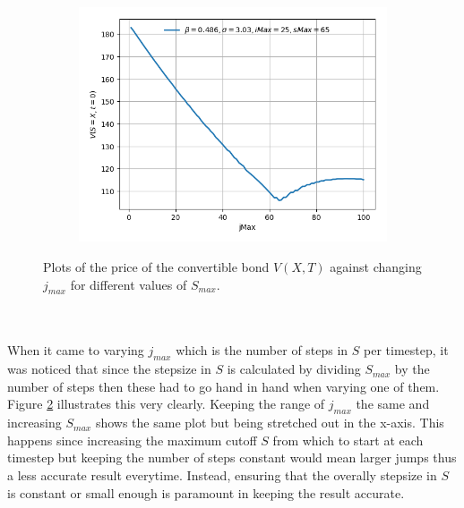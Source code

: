\documentclass{article}
\begin{document}
\medskip
\begin{figure}[!ht]\ContinuedFloat
\centering
\begin{minipage}{.55\textwidth}
  \centering
  \begin{subfigure}{\textwidth}
      \includegraphics[width=\linewidth]{../images/smax_jmax/65_european_varying_jmax.png}
      \label{fig:varying_jmax_65}
  \end{subfigure}
\end{minipage}
\caption{Plots of the price of the convertible bond $V(X,T)$ against changing $j_{max}$ for different values of $S_{max}$.}
\label{fig:varying_jmax}
\end{figure}
\\
\\
When it came to varying $j_{max}$ which is the number of steps in $S$ per timestep, it was noticed
that since the stepsize in $S$ is calculated by dividing $S_{max}$ by the number of steps then these had to go
hand in hand when varying one of them.
Figure \ref{fig:varying_jmax} illustrates this very clearly.
Keeping the range of $j_{max}$ the same and increasing $S_{max}$ shows the same plot but being stretched out in the x-axis.
This happens since increasing the maximum cutoff $S$ from which to start at each timestep but keeping the number of steps constant would mean larger jumps
thus a less accurate result everytime.
Instead, ensuring that the overally stepsize in $S$ is constant or small enough is paramount in keeping the result accurate.
\end{document}
